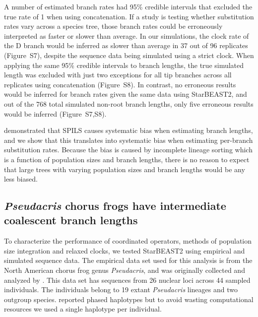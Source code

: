 \documentclass[12pt]{article}
\begin{document}
A number of estimated branch rates had 95\% credible intervals that excluded
the true rate of 1 when using concatenation. If a study is testing whether
substitution rates vary across a species tree, those branch rates could be
erroneously interpreted as faster or slower than average. In our simulations,
the clock rate of the D branch would be inferred as slower than average in 37
out of 96 replicates (Figure~S7), despite the sequence data being simulated
using a strict clock. When applying the same 95\% credible intervals to branch
lengths, the true simulated length was excluded with just two exceptions for
all tip branches across all replicates using concatenation (Figure~S8). In
contrast, no erroneous results would be inferred for branch rates given the
same data using StarBEAST2, and out of the 768 total simulated non-root branch
lengths, only five erroneous results would be inferred (Figure~S7,S8).

\cite{Mendes01072016} demonstrated that SPILS causes systematic bias when
estimating branch lengths, and we show that this translates into systematic
bias when estimating per-branch substitution rates. Because the bias is caused
by incomplete lineage sorting which is a function of population sizes and
branch lengths, there is no reason to expect that large trees with varying
population sizes and branch lengths would be any less biased.

\subsection{\textit{Pseudacris} chorus frogs have intermediate coalescent branch lengths}

To characterize the performance of coordinated operators, methods of
population size integration and relaxed clocks, we tested StarBEAST2 using
empirical and simulated sequence data. The empirical data set used for this
analysis is from the North American chorus frog genus \textit{Pseudacris}, and
was originally collected and analyzed by \cite{Barrow201478}. This data set
has sequences from 26 nuclear loci across 44 sampled individuals. The individuals
belong to 19 extant \textit{Pseudacris} lineages and two outgroup species.
\cite{Barrow201478} reported phased haplotypes but to avoid wasting
computational resources we used a single haplotype per individual.
\end{document}
